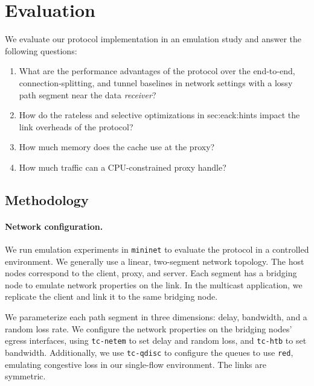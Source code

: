 \section{Evaluation}
\label{sec:evaluation}

We evaluate our \Sys protocol implementation in an emulation study and answer
the following questions:
\vspace{-0.2cm}
\begin{enumerate}[noitemsep]
    \item What are the performance advantages of the \Sys protocol over the
     end-to-end, connection-splitting, and tunnel baselines in network settings
     with a lossy path segment near the data \textit{receiver}?
    \item How do the rateless and selective optimizations in \Cref
     {sec:eack:hints} impact the link overheads of the \Sys protocol?
    \item How much memory does the cache use at the proxy?
    \item How much traffic can a CPU-constrained proxy handle?
\end{enumerate}

\subsection{Methodology}

\paragraph{Network configuration.}

We run emulation experiments in \texttt{mininet} to evaluate the \Sys protocol
in a controlled environment. We generally use a linear, two-segment network
topology.
The host nodes
correspond to the client, proxy, and server. Each segment has a bridging
node to emulate network properties on the link. In the multicast application,
we replicate the client and link it to the same bridging node.

We parameterize each path segment in three dimensions: delay, bandwidth, and a
random loss rate. We configure the network properties on the bridging nodes’
egress interfaces, using \texttt{tc-netem} to set delay and random loss,
and \texttt{tc-htb} to set bandwidth. Additionally, we use \texttt{tc-qdisc} to
configure the queues to use \texttt{red}, emulating congestive loss in our
single-flow environment. The links are symmetric.

